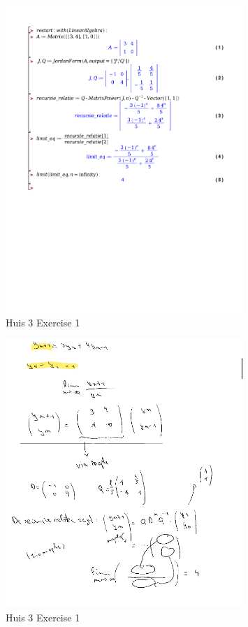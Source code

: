 \documentclass[a4paper]{report}
\begin{document}
\begin{figure}[H]
	\centering
	\includegraphics[width=0.8\textwidth]{exercises/huis_3_ex_1.pdf}
	\caption{Huis 3 Exercise 1}
	\label{fig:huis_3_ex_1_Maple}
\end{figure}

\begin{figure}[H]
	\centering
	\includegraphics[width=0.8\textwidth]{assets/huis_3_ex_1.png}
	\caption{Huis 3 Exercise 1}
	\label{fig:huis_3_ex_1}
\end{figure}
\end{document}
